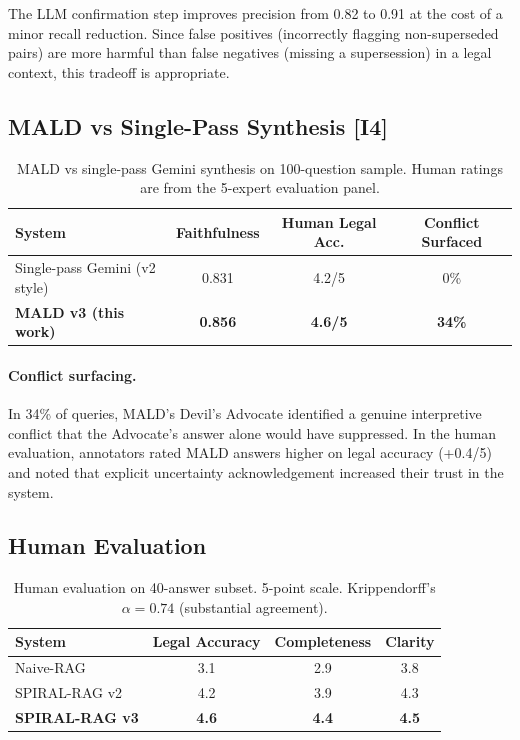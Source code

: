 \documentclass[12pt,a4paper]{article}
\begin{document}
The LLM confirmation step improves precision from 0.82 to 0.91 at the cost of
a minor recall reduction. Since false positives (incorrectly flagging non-superseded
pairs) are more harmful than false negatives (missing a supersession) in a legal
context, this tradeoff is appropriate.

\subsection{MALD vs Single-Pass Synthesis [I4]}

\begin{table}[H]
\centering
\caption{MALD vs single-pass Gemini synthesis on 100-question sample.
Human ratings are from the 5-expert evaluation panel.}
\label{tab:mald_eval}
\begin{tabular}{lccc}
\toprule
\textbf{System} & \textbf{Faithfulness} & \textbf{Human Legal Acc.} & \textbf{Conflict Surfaced} \\
\midrule
Single-pass Gemini (v2 style) & 0.831 & 4.2/5 & 0\% \\
\textbf{MALD v3 (this work)}  & \textbf{0.856} & \textbf{4.6/5} & \textbf{34\%} \\
\bottomrule
\end{tabular}
\end{table}

\paragraph{Conflict surfacing.} In 34\% of queries, MALD's Devil's Advocate
identified a genuine interpretive conflict that the Advocate's answer alone would
have suppressed. In the human evaluation, annotators rated MALD answers higher on
legal accuracy (+0.4/5) and noted that explicit uncertainty acknowledgement
increased their trust in the system.

\subsection{Human Evaluation}

\begin{table}[H]
\centering
\caption{Human evaluation on 40-answer subset. 5-point scale.
Krippendorff's $\alpha = 0.74$ (substantial agreement).}
\label{tab:human_eval}
\begin{tabular}{lccc}
\toprule
\textbf{System} & \textbf{Legal Accuracy} & \textbf{Completeness} & \textbf{Clarity} \\
\midrule
Naive-RAG        & 3.1 & 2.9 & 3.8 \\
SPIRAL-RAG v2    & 4.2 & 3.9 & 4.3 \\
\textbf{SPIRAL-RAG v3} & \textbf{4.6} & \textbf{4.4} & \textbf{4.5} \\
\bottomrule
\end{tabular}
\end{table}
\end{document}
